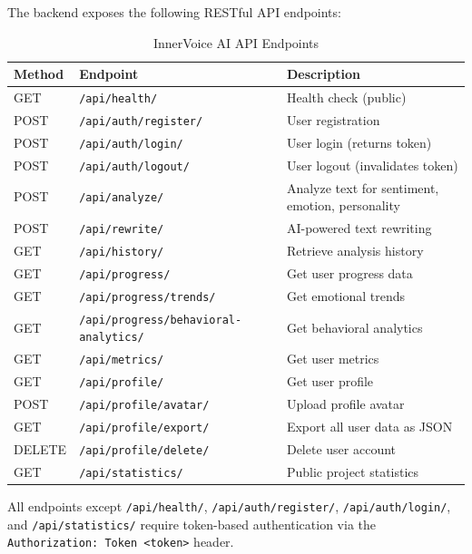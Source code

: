 \documentclass[12pt,a4paper]{report}
\begin{document}
\begin{itemize}
The backend exposes the following RESTful API endpoints:

\begin{table}[H]
\centering
\caption{InnerVoice AI API Endpoints}
\label{tab:api_endpoints}
\small
\begin{tabularx}{\textwidth}{|l|l|X|}
\hline
\textbf{Method} & \textbf{Endpoint} & \textbf{Description} \\
\hline
GET & \texttt{/api/health/} & Health check (public) \\
\hline
POST & \texttt{/api/auth/register/} & User registration \\
\hline
POST & \texttt{/api/auth/login/} & User login (returns token) \\
\hline
POST & \texttt{/api/auth/logout/} & User logout (invalidates token) \\
\hline
POST & \texttt{/api/analyze/} & Analyze text for sentiment, emotion, personality \\
\hline
POST & \texttt{/api/rewrite/} & AI-powered text rewriting \\
\hline
GET & \texttt{/api/history/} & Retrieve analysis history \\
\hline
GET & \texttt{/api/progress/} & Get user progress data \\
\hline
GET & \texttt{/api/progress/trends/} & Get emotional trends \\
\hline
GET & \texttt{/api/progress/behavioral-analytics/} & Get behavioral analytics \\
\hline
GET & \texttt{/api/metrics/} & Get user metrics \\
\hline
GET & \texttt{/api/profile/} & Get user profile \\
\hline
POST & \texttt{/api/profile/avatar/} & Upload profile avatar \\
\hline
GET & \texttt{/api/profile/export/} & Export all user data as JSON \\
\hline
DELETE & \texttt{/api/profile/delete/} & Delete user account \\
\hline
GET & \texttt{/api/statistics/} & Public project statistics \\
\hline
\end{tabularx}
\end{table}

All endpoints except \texttt{/api/health/}, \texttt{/api/auth/register/}, \texttt{/api/auth/login/}, and \texttt{/api/statistics/} require token-based authentication via the \texttt{Authorization: Token <token>} header.


\end{itemize}
\end{document}
